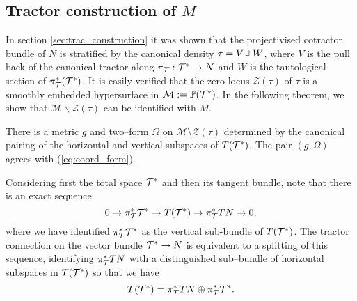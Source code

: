 \subsection{Tractor construction of $M$}\label{sec:trac_construction_g}

In section \ref{sec:trac_construction} it was shown that the projectivised cotractor bundle of $N$ is stratified by the canonical density $\tau=V\hook W$, where $V$ is the pull back of the canonical tractor along $\pi_{\mathcal{T}}:\mathcal{T}^*\rightarrow N$ and $W$ is the tautological section of $\pi_{\mathcal{T}}^*(\mathcal{T}^*)$. It is easily verified that the zero locus $\mathcal{Z}(\tau)$ of $\tau$ is a smoothly embedded hypersurface in $\mathcal{M}:=\mathbb{P}(\mathcal{T}^*)$. %
In the following theorem, we show that $\mathcal{M}\backslash\mathcal{Z}(\tau)$ can be identified with $M$.

\begin{theo}\cite{DGW}\label{metric} 
There is a metric $g$ and two--form $\Omega$ on $\mathcal{M}\setminus \mathcal{Z}(\tau)$ determined by the canonical pairing of the horizontal and vertical subspaces of $T(\mathcal{T}^*)$. The pair $(g,\Omega)$ agrees with (\ref{eq:coord_form}).
\end{theo}
 Considering first the total space $\mathcal{T}^*$ and then its tangent
 bundle, note that there is an exact sequence
  \begin{equation}\label{TM}
0\to \pi_{\mathcal{T}}^* \mathcal{T}^*\to T(\mathcal{T}^*)\to \pi_{\mathcal{T}}^*TN\to 0,
  \end{equation}
  where we have identified $\pi_{\mathcal{T}}^* \mathcal{T}^*$ as the vertical sub-bundle of $T(\mathcal{T}^*)$.
The tractor connection on the vector bundle $\mathcal{T}^*\to N$ is equivalent to a splitting of this sequence, identifying $\pi_{\mathcal{T}}^*TN$ with a distinguished  sub--bundle of horizontal subspaces in 
$ T(\mathcal{T}^*)$ so that we have 
\begin{equation}\label{HV}
T(\mathcal{T}^*)=  \pi_{\mathcal{T}}^*TN\oplus \pi_{\mathcal{T}}^* \mathcal{T}^* .
\end{equation}

